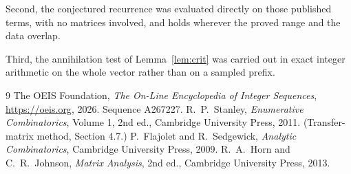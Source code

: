 \documentclass[11pt,a4paper]{article}
\theoremstyle{plain}
\theoremstyle{definition}
\begin{document}
Second, the conjectured recurrence was evaluated directly on those published terms, with no
matrices involved, and holds wherever the proved range and the data overlap.

Third, the annihilation test of Lemma~\ref{lem:crit} was carried out in exact integer
arithmetic on the whole vector rather than on a sampled prefix.

\begin{thebibliography}{9}
 The OEIS Foundation, \emph{The On-Line Encyclopedia of Integer
Sequences}, \url{https://oeis.org}, 2026. Sequence A267227.
 R.~P.~Stanley, \emph{Enumerative Combinatorics}, Volume 1, 2nd ed.,
Cambridge University Press, 2011. (Transfer-matrix method, Section 4.7.)
 P.~Flajolet and R.~Sedgewick, \emph{Analytic Combinatorics}, Cambridge
University Press, 2009.
 R.~A.~Horn and C.~R.~Johnson, \emph{Matrix Analysis}, 2nd ed., Cambridge
University Press, 2013.
\end{thebibliography}
\end{document}
